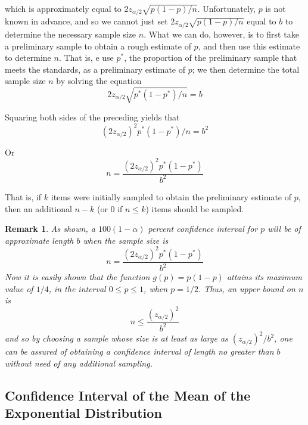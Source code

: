 \documentclass[12pt]{article}
\newtheorem{remark}[theorem]{Remark}
\begin{document}
which is approximately equal to $2 z_{\alpha / 2} \sqrt {p(1-p)/n}$. Unfortunately, $p$ is not known in advance, and so we cannot just set $2 z_{\alpha / 2} \sqrt {p(1-p)/n}$ equal to $b$ to determine the necessary sample size $n$. What we can do, however, is to first take a preliminary sample to obtain a rough estimate of $p$, and then use this estimate to determine $n$. That is, e use $p^*$, the proportion of the preliminary sample that meets the standards, as a preliminary estimate of $p$; we then determine the total sample size $n$ by solving the equation
\begin{equation*}
  2 z_{\alpha / 2} \sqrt {p^* (1 - p^*) / n} = b
\end{equation*}

Squaring both sides of the preceding yields that
\begin{equation*}
  (2 z_{\alpha / 2})^2 p^* (1 - p^*) / n = b^2
\end{equation*}

Or
\begin{equation*}
  n = \frac {(2 z_{\alpha / 2})^2 p^* (1 - p^*)}{b^2}
\end{equation*}

That is, if $k$ items were initially sampled to obtain the preliminary estimate of $p$, then an additional $n-k$ (or 0 if $n \le k$) items should be sampled.

\begin{remark}
  As shown, a $100(1-\alpha)$ percent confidence interval for $p$ will be of approximate length $b$ when the sample size is
  \begin{equation*}
    n = \frac {(2 z_{\alpha / 2})^2 p^* (1 - p^*)}{b^2}
  \end{equation*}
  Now it is easily shown that the function $g(p) = p(1-p)$ attains its maximum value of $1/4$, in the interval $0 \le p \le 1$, when $p = 1/2$. Thus, an upper bound on $n$ is
  \begin{equation*}
    n \le \frac {(z_{\alpha / 2})^2}{b^2}
  \end{equation*}
  and so by choosing a sample whose size is at least as large as $(z_{\alpha / 2})^2/b^2$, one can be assured of obtaining a confidence interval of length no greater than $b$ without need of any additional sampling.
\end{remark}

\subsection{Confidence Interval of the Mean of the Exponential Distribution}
\end{document}
